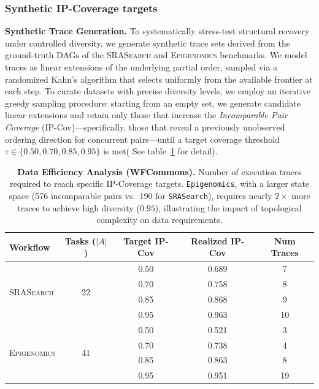 \documentclass{article}
\theoremstyle{plain}
\theoremstyle{definition}
\theoremstyle{remark}
\begin{document}
\subsubsection{Synthetic IP-Coverage targets}
\noindent \textbf{Synthetic Trace Generation.}
To systematically stress-test structural recovery under controlled diversity, we generate synthetic trace sets derived from the ground-truth DAGs of the \textsc{SRASearch} and \textsc{Epigenomics} benchmarks. We model traces as linear extensions of the underlying partial order, sampled via a randomized Kahn’s algorithm that selects uniformly from the available frontier at each step. To curate datasets with precise diversity levels, we employ an iterative greedy sampling procedure: starting from an empty set, we generate candidate linear extensions and retain only those that increase the \emph{Incomparable Pair Coverage} (IP-Cov)—specifically, those that reveal a previously unobserved ordering direction for concurrent pairs—until a target coverage threshold $\tau \in \{0.50, 0.70, 0.85, 0.95\}$ is met( See table~\ref{tab:wf_data_efficiency} for detail).

\begin{table}[t]
\centering
\caption{\textbf{Data Efficiency Analysis (WFCommons).} 
Number of execution traces required to reach specific IP-Coverage targets. 
\texttt{Epigenomics}, with a larger state space (576 incomparable pairs vs.\ 190 for \texttt{SRASearch}), requires nearly $2\times$ more traces to achieve high diversity ($0.95$), illustrating the impact of topological complexity on data requirements.}
\label{tab:wf_data_efficiency}
\small
\begin{tabular}{l c c c c}
\toprule
\textbf{Workflow} & \textbf{Tasks ($|A|$)} & \textbf{Target IP-Cov} & \textbf{Realized IP-Cov} & \textbf{Num Traces} \\
\midrule
\multirow{4}{*}{\textsc{SRASearch}} & \multirow{4}{*}{22} 
  & 0.50 & 0.689 & 7 \\
& & 0.70 & 0.758 & 8 \\
& & 0.85 & 0.868 & 9 \\
& & 0.95 & 0.963 & 10 \\
\midrule
\multirow{4}{*}{\textsc{Epigenomics}} & \multirow{4}{*}{41} 
  & 0.50 & 0.521 & 3 \\
& & 0.70 & 0.738 & 4 \\
& & 0.85 & 0.863 & 8 \\
& & 0.95 & 0.951 & 19 \\
\bottomrule
\end{tabular}
\end{table}
\end{document}
